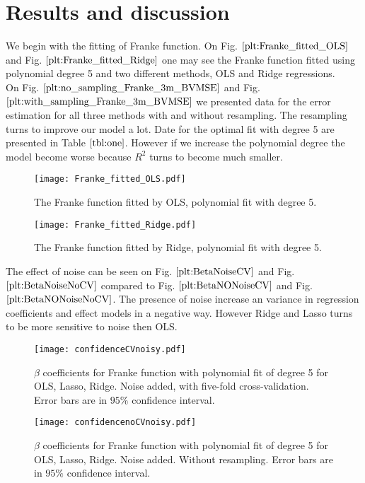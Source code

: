 \documentclass[10pt]{article}
\begin{document}
\section{Results and discussion} \label{Results}
We begin with the fitting of Franke function. On Fig. $\ref{plt:Franke_fitted_OLS}$ and Fig. $\ref{plt:Franke_fitted_Ridge}$ one may see the Franke function fitted using polynomial degree 5 and two different methods, OLS and Ridge regressions.   \\
On Fig. $\ref{plt:no_sampling_Franke_3m_BVMSE}$ and Fig. $\ref{plt:with_sampling_Franke_3m_BVMSE}$ we presented data for the error estimation for all three methods with and without resampling. The resampling turns to improve our model a lot. Date for the optimal fit with degree 5 are presented in Table $\ref{tbl:one}$. However if we increase the polynomial degree the model become worse because $R^2$ turns to become much smaller.\\

\begin{figure}
	\centerline{\texttt{[image: Franke\_fitted\_OLS.pdf]}}
	\caption{The  Franke function fitted by OLS, polynomial fit with degree 5.} \label{plt:Franke_fitted_OLS}
\end{figure}

\begin{figure}
	\centerline{\texttt{[image: Franke\_fitted\_Ridge.pdf]}}
	\caption{The  Franke function fitted by Ridge, polynomial fit with degree 5.}
	\label{plt:Franke_fitted_Ridge}
\end{figure}
\newpage
The effect of noise can be seen on Fig. $\ref{plt:BetaNoiseCV}$ and Fig.$\ref{plt:BetaNoiseNoCV}$ compared to Fig. $\ref{plt:BetaNONoiseCV}$ and Fig. $\ref{plt:BetaNONoiseNoCV}$. The presence of noise increase an variance in regression coefficients and effect models in a negative way. However Ridge and Lasso turns to be more sensitive to noise then OLS.


\begin{figure}
	\centerline{\texttt{[image: confidenceCVnoisy.pdf]}}
	\caption{$\beta$ coefficients for Franke function with polynomial fit of degree 5 for OLS, Lasso, Ridge. Noise added, with five-fold cross-validation. Error bars are in $95\%$ confidence interval.}
	\label{plt:BetaNoiseCV}
\end{figure}

\begin{figure}
	\centerline{\texttt{[image: confidencenoCVnoisy.pdf]}}
	\caption{$\beta$ coefficients for Franke function with polynomial fit of degree 5 for OLS, Lasso, Ridge. Noise added. Without resampling. Error bars are in $95\%$ confidence interval.}
	\label{plt:BetaNoiseNoCV}
\end{figure}
\end{document}
